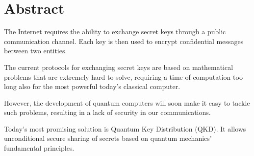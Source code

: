\documentclass{Configuration_Files/PoliMi3i_thesis}
\begin{document}


\pagestyle{empty} %
\frontmatter %


\startpreamble
\setcounter{page}{1} %

\chapter*{Abstract} 
The Internet requires the ability to exchange secret keys through a public communication channel. Each key is then used to encrypt confidential messages between two entities.

The current protocols for exchanging secret keys are based on mathematical problems that are extremely hard to solve, requiring a time of computation too long also for the most powerful today's classical computer.

However, the development of quantum computers will soon make it easy to tackle such problems, resulting in a lack of security in our communications.

Today's most promising solution is Quantum Key Distribution (QKD). It allows unconditional secure sharing of secrets based on quantum mechanics' fundamental principles.
\end{document}
